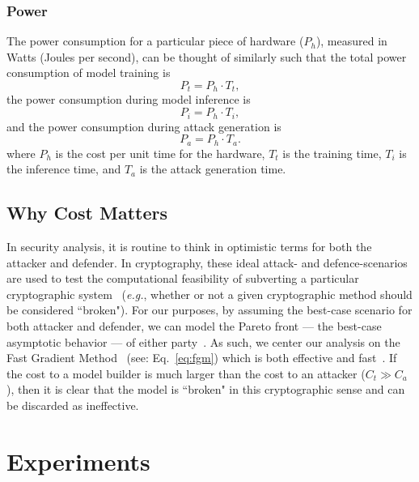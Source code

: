 \documentclass[conference]{IEEEtran}
\newcommand{\cm}[1]{#1}
\begin{document}
\subsubsection{Power}
The power consumption for a particular piece of hardware ($P_h$), measured in Watts (Joules per second), can be thought of similarly such that the total power consumption of model training is
$$
    P_t = P_h \cdot T_t,
    \label{eq:power_training}
$$
the power consumption during model inference is
$$
    P_i = P_h \cdot T_i,
    \label{eq:power_inference}
$$
and the power consumption during attack generation is
$$
    P_a = P_h \cdot T_a.
    \label{eq:power_attack}
$$
where $P_h$ is the cost per unit time for the hardware, $T_t$ is the training time, $T_i$ is the inference time, and $T_a$ is the attack generation time.

\subsection{Why Cost Matters}

 In security analysis, it is  routine to think in optimistic terms for both the attacker and defender. In cryptography, these ideal attack- and defence-scenarios are used to test the computational feasibility of subverting a particular cryptographic system~\cite{kamal2017study,leurent2020sha} (\textit{e.g.}, whether or not a given cryptographic method should be considered ``broken"). For our purposes, by assuming the best-case scenario for both attacker and defender, we can model the Pareto front --- the best-case asymptotic behavior --- of either party~\cite{zitzler2008quality}.
As such, we center our analysis on the Fast Gradient Method~\cite{fgm} (see: Eq.~\ref{eq:fgm}) which is both effective and fast~\cite{meyers}. If the cost to a model builder is much larger than the cost to an attacker ($C_t \gg C_a$), then it is  clear that the model is ``broken" in this cryptographic sense and can be discarded as ineffective. 





\section{Experiments}
\label{experiments}
\end{document}
